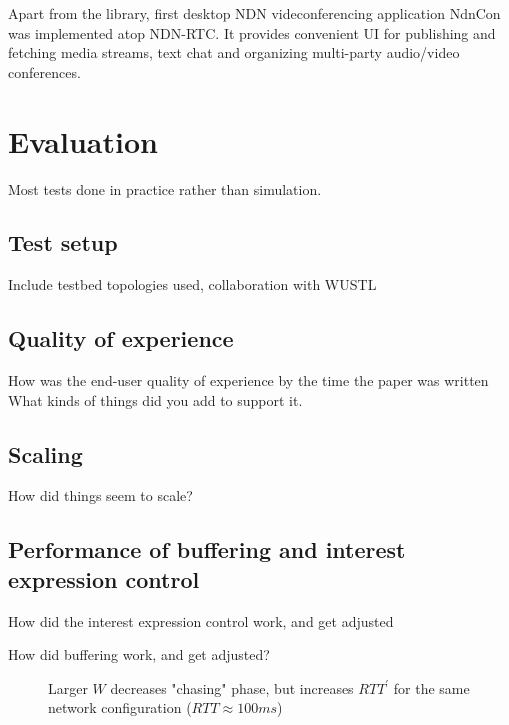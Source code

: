 \documentclass{icn/sig-alternate-2012} %
\newcommand{\ndnrtcName}{NDN-RTC} %
\newcommand{\ndnconName}{NdnCon}
\begin{document}
Apart from the library, first desktop NDN videconferencing application \ndnconName{} \cite{ndncon} was implemented atop \ndnrtcName{}. It provides convenient UI for publishing and fetching media streams, text chat and organizing multi-party audio/video conferences.

\section{Evaluation}
\label{sec:eval} 

Most tests done in practice rather than simulation. 

\subsection{Test setup} 

Include testbed topologies used, collaboration with WUSTL

\subsection{Quality of experience} 

How was the end-user quality of experience by the time the paper was written
What kinds of things did you add to support it. 

\subsection{Scaling}

How did things seem to scale? 

\subsection{Performance of buffering and interest expression control}

How did the interest expression control work, and get adjusted
 
How did buffering work, and get adjusted? 
\begin{figure}[t!]
\centering
\begin{scriptsize}
\end{scriptsize}
\caption{Larger $W$ decreases "chasing" phase, but increases $RTT^\prime$ for the same network configuration ($RTT\approx100ms$)}
\label{fig:ws}
\end{figure}
\end{document}
